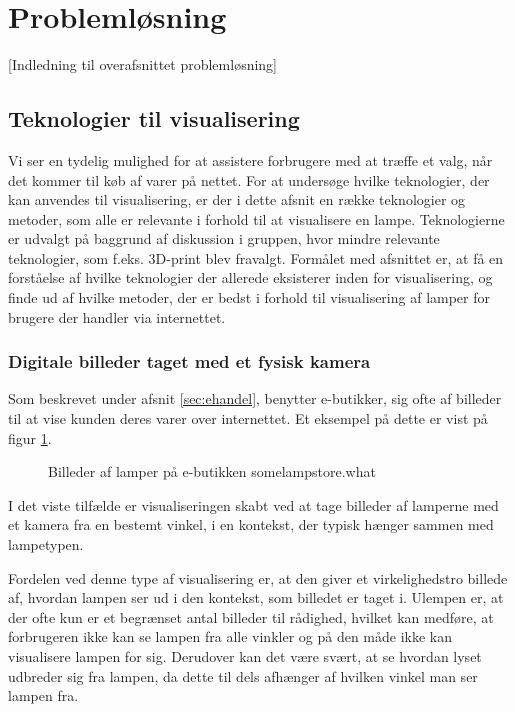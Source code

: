 \section{Problemløsning}

[Indledning til overafsnittet problemløsning]

\subsection{Teknologier til visualisering}
Vi ser en tydelig mulighed for at assistere forbrugere med at træffe et valg, når det kommer til køb af varer på nettet. For at undersøge hvilke teknologier, der kan anvendes til visualisering, er der i dette afsnit en række teknologier og metoder, som alle er relevante i forhold til at visualisere en lampe. Teknologierne er udvalgt på baggrund af diskussion i gruppen, hvor mindre relevante teknologier, som f.eks. 3D-print blev fravalgt. Formålet med afsnittet er, at få en forståelse af hvilke teknologier der allerede eksisterer inden for visualisering, og finde ud af hvilke metoder, der er bedst i forhold til visualisering af lamper for brugere der handler via internettet.

\subsubsection{Digitale billeder taget med et fysisk kamera}
Som beskrevet under afsnit \ref{sec:ehandel}, benytter e-butikker, sig ofte af billeder til at vise kunden deres varer over internettet. Et eksempel på dette er vist på figur \ref{fig:e_handel_lampebilleder}.

\begin{figure}[H]
    \centering
    \fbox{\rule{\textwidth}{5cm}}
    \caption{Billeder af lamper på e-butikken somelampstore.what}
    \label{fig:e_handel_lampebilleder}
\end{figure} 

I det viste tilfælde er visualiseringen skabt ved at tage billeder af lamperne med et kamera fra en bestemt vinkel, i en kontekst, der typisk hænger sammen med lampetypen. 

Fordelen ved denne type af visualisering er, at den giver et virkelighedstro billede af, hvordan lampen ser ud i den kontekst, som billedet er taget i. Ulempen er, at der ofte kun er et begrænset antal billeder til rådighed, hvilket kan medføre, at forbrugeren ikke kan se lampen fra alle vinkler og på den måde ikke kan visualisere lampen for sig. Derudover kan det være svært, at se hvordan lyset udbreder sig fra lampen, da dette til dels afhænger af hvilken vinkel man ser lampen fra. 

